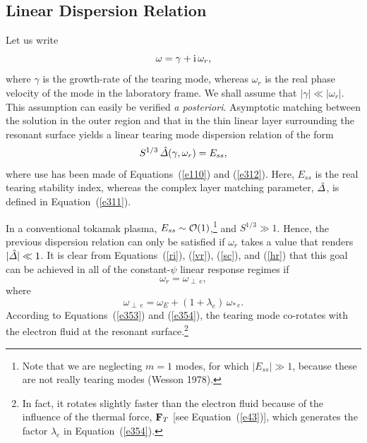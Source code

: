 \documentclass[notitlepage,12pt]{article}
\begin{document}
\subsection{Linear Dispersion Relation}
Let us write
\begin{equation}
\omega = \gamma+{\rm i}\,\omega_r,
\end{equation}
where $\gamma$ is the growth-rate of the tearing mode, whereas $\omega_r$ is the real
phase velocity of the mode in the laboratory frame. We shall assume that $|\gamma|\ll |\omega_r|$. This assumption can
easily be verified {\em a posteriori}. Asymptotic matching between the solution in the outer region and that in the
thin linear layer surrounding the resonant surface yields a linear tearing mode dispersion relation of the form
\begin{equation}\label{e352}
S^{1/3}\,\hat{\mit\Delta}(\gamma,\omega_r) = E_{ss},
\end{equation}
where use has been made of Equations~(\ref{e110}) and (\ref{e312}). Here, $E_{ss}$ is the real tearing stability index, 
whereas the complex layer matching parameter, $\hat{\mit\Delta}$, is defined in Equation~(\ref{e311}). 

In a conventional tokamak plasma, $E_{ss}\sim {\cal O}(1)$,\footnote{Note that we are neglecting $m=1$ modes, for which $|E_{ss}|\gg 1$,
because these are not really tearing modes
(Wesson 1978).} and $S^{1/3}\gg 1$. Hence, the previous dispersion relation can only be satisfied if $\omega_r$ takes a
value that renders $|\hat{\mit\Delta}|\ll 1$. It is clear from Equations~(\ref{ri}), (\ref{vr}), (\ref{sc}), and (\ref{hr}) that this goal
can be achieved in all of the constant-$\psi$ linear response regimes if
\begin{equation}\label{e353}
\omega_r = \omega_{\perp\,e},
\end{equation}
where
\begin{equation}\label{e354}
\omega_{\perp\,e} = \omega_E+(1+\lambda_e)\,\omega_{\ast\,e}.
\end{equation}
According to Equations~(\ref{e353}) and (\ref{e354}), the tearing mode co-rotates with the electron fluid at the resonant
 surface.\footnote{In fact, it
rotates slightly faster than the electron fluid because of the influence of the thermal force, ${\bf F}_T$ [see Equation~(\ref{e43})],
which generates the factor $\lambda_e$ in Equation~(\ref{e354}).}
\end{document}
